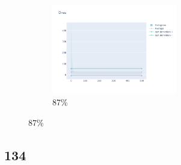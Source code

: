 \documentclass[12pt, fleqn]{report}                             %
\theoremstyle{break}                                            %
\begin{document}
\begin{figure}[ht!]
\begin{subfigure}[b]{0.4\linewidth}
          \includegraphics[width=0.6\textwidth]{Images/132/dia-d.png}
          \caption{87\%}
        \end{subfigure}
      \end{figure}


      \clearpage
      \subsection{134}
\end{document}
